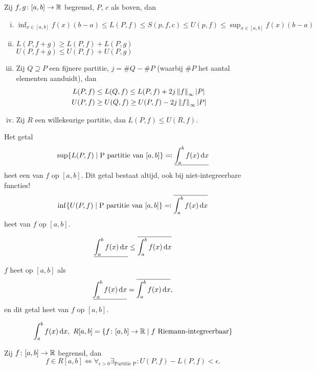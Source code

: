 \documentclass{2wa40summary}
\begin{document}
			\begin{lemma}
				Zij $ f,g\colon [a,b] \to \mathbb{R} $ begrensd, $P$, $c$ als boven, dan
				\begin{enumerate}[(i)]
					\item $\displaystyle \inf_{x\in [a,b]} f(x) (b-a) \le L(P,f) \le S(p,f,c) \le U(p,f) \le \sup_{x \in [a,b]} f(x) (b-a) $
					\item $L(P,f+g) \ge L(P,f) + L(P,g)$ \\
					$U(P,f+g) \le U(P,f) + U(P,g)$
					\item Zij $Q \supseteq P$ een fijnere partitie, $ j = \#Q -\#P $ (waarbij $\#P$ het aantal elementen aanduidt), dan 
					\[ 
						\begin{split}
							L(P,f) &\le L(Q,f) \le L(P,f) + 2j \left\|f\right\|_\infty {\left|P\right|} \\
							U(P,f) &\ge U(Q,f) \ge U(P,f) - 2j \left\|f\right\|_\infty {\left|P\right|}
						\end{split}
					 \]
					 \item Zij $R$ een willekeurige partitie, dan $ L(P,f) \le U(R,f). $
				\end{enumerate}
			\end{lemma}
			\begin{define}
				 Het getal \[ \sup \{ L(P,f) \mid \text{P partitie van }[a,b] \} \eqqcolon  \underline{\int_{a}^{b} f(x) \mathop{}\!\mathrm{d} x} \]
				 heet een  van $f$ op $[a,b]$.
				 \opm Dit getal bestaat altijd, ook bij niet-integreerbare functies!
				 \[ 
					 \inf \{ U(P,f) \mid \text{P partitie van }[a,b] \} \eqqcolon  \overline{\int_{a}^{b} f(x) \mathop{}\!\mathrm{d} x}
				  \]
				  heet  van $f$ op $[a,b]$.
			\end{define}
			\begin{gevolg}
				\[ \underline{\int_{a}^{b} f(x) \mathop{}\!\mathrm{d} x} \le \overline{\int_{a}^{b} f(x) \mathop{}\!\mathrm{d} x} \]
			\end{gevolg}
			\begin{define}
				$f$ heet  op $[a,b]$ als 
				\[ \underline{\int_{a}^{b} f(x) \mathop{}\!\mathrm{d} x} = \overline{\int_{a}^{b} f(x) \mathop{}\!\mathrm{d} x}, \]
				en dit getal heet  van $f$ op $[a,b]$.
				\begin{nota}
					\[
					\int_{a}^{b} f(x) \mathop{}\!\mathrm{d} x,\ R[a,b] = \{ f\colon [a,b]\to \mathbb{R} \mid f \text{ Riemann-integreerbaar} \}
					\]
				\end{nota}
			\end{define}
			
			\begin{theorem}
				Zij $ f\colon [a,b] \to \mathbb{R} $ begrensd, dan
				\[ 
					f \in R[a,b] \iff \forall_{\epsilon >0} \exists_{\text{Partitie P}}: U(P,f) - L(P,f) < \epsilon.
				 \]
			\end{theorem}
			
\end{document}
